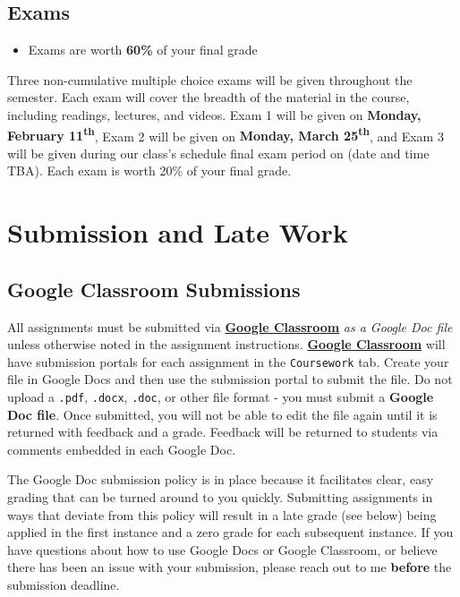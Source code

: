 \documentclass[]{book}
\newenvironment{rmdblock}[1]
  {\begin{shaded*}
  \begin{itemize}
  \renewcommand{\labelitemi}{
    \raisebox{-.7\height}[0pt][0pt]{
      {\setkeys{Gin}{width=3em,keepaspectratio}\texttt{[image: images/\#1]}}
    }
  }
  \item
  }
  {
  \end{itemize}
  \end{shaded*}
  }
\newenvironment{rmdtip}
  {\begin{rmdblock}{tip}}
  {\end{rmdblock}}
\begin{document}
\hypertarget{exams}{%
\subsection{Exams}\label{exams}}

\begin{rmdtip}
Exams are worth \textbf{60\%} of your final grade
\end{rmdtip}

Three non-cumulative multiple choice exams will be given throughout the semester. Each exam will cover the breadth of the material in the course, including readings, lectures, and videos. Exam 1 will be given on \textbf{Monday, February 11\textsuperscript{th}}, Exam 2 will be given on \textbf{Monday, March 25\textsuperscript{th}}, and Exam 3 will be given during our class's schedule final exam period on (date and time TBA). Each exam is worth 20\% of your final grade.

\hypertarget{submission-and-late-work}{%
\section{Submission and Late Work}\label{submission-and-late-work}}

\hypertarget{google-classroom-submissions}{%
\subsection{Google Classroom Submissions}\label{google-classroom-submissions}}

All assignments must be submitted via \textbf{\href{https://classroom.google.com}{Google Classroom}} \emph{as a Google Doc file} unless otherwise noted in the assignment instructions. \textbf{\href{https://classroom.google.com}{Google Classroom}} will have submission portals for each assignment in the \texttt{Coursework} tab. Create your file in Google Docs and then use the submission portal to submit the file. Do not upload a \texttt{.pdf}, \texttt{.docx}, \texttt{.doc}, or other file format - you must submit a \textbf{Google Doc file}. Once submitted, you will not be able to edit the file again until it is returned with feedback and a grade. Feedback will be returned to students via comments embedded in each Google Doc.

The Google Doc submission policy is in place because it facilitates clear, easy grading that can be turned around to you quickly. Submitting assignments in ways that deviate from this policy will result in a late grade (see below) being applied in the first instance and a zero grade for each subsequent instance. If you have questions about how to use Google Docs or Google Classroom, or believe there has been an issue with your submission, please reach out to me \textbf{before} the submission deadline.
\end{document}
